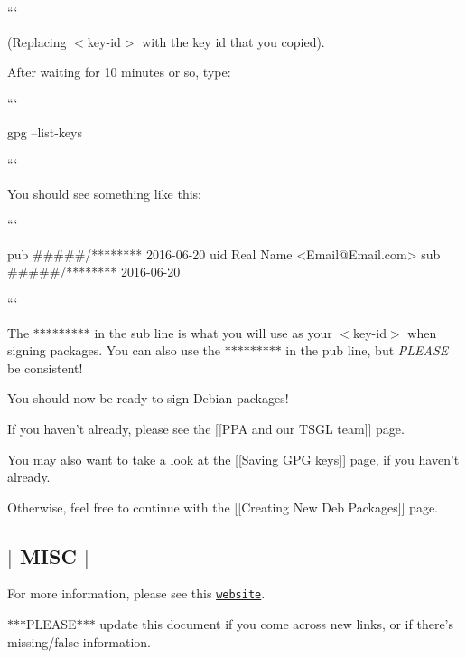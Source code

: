 ```

(Replacing {\ttfamily $<$key-\/id$>$} with the key id that you copied).

After waiting for 10 minutes or so, type\-:

``` \begin{DoxyVerb}gpg --list-keys
\end{DoxyVerb}


```

You should see something like this\-:

``` \begin{DoxyVerb}pub   #####/******** 2016-06-20
uid                  Real Name <Email@Email.com>
sub   #####/******** 2016-06-20
\end{DoxyVerb}


```

The {\ttfamily $\ast$$\ast$$\ast$$\ast$$\ast$$\ast$$\ast$$\ast$$\ast$} in the {\ttfamily sub} line is what you will use as your {\ttfamily $<$key-\/id$>$} when signing packages. You can also use the {\ttfamily $\ast$$\ast$$\ast$$\ast$$\ast$$\ast$$\ast$$\ast$$\ast$} in the {\ttfamily pub} line, but {\itshape P\-L\-E\-A\-S\-E} be consistent!

You should now be ready to sign Debian packages!

If you haven't already, please see the \mbox{[}\mbox{[}P\-P\-A and our T\-S\-G\-L team\mbox{]}\mbox{]} page.

You may also want to take a look at the \mbox{[}\mbox{[}Saving G\-P\-G keys\mbox{]}\mbox{]} page, if you haven't already.

Otherwise, feel free to continue with the \mbox{[}\mbox{[}Creating New Deb Packages\mbox{]}\mbox{]} page. 

 \subsection*{$\vert$ M\-I\-S\-C $\vert$ }

For more information, please see this \href{http://ubuntuforums.org/showthread.php?t=680292}{\tt website}.

$\ast$$\ast$$\ast$\-P\-L\-E\-A\-S\-E$\ast$$\ast$$\ast$ update this document if you come across new links, or if there's missing/false information. 